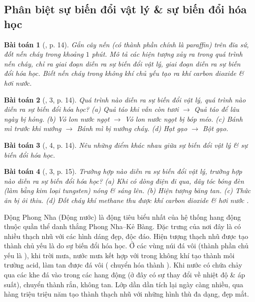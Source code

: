 \documentclass{article}
\newtheorem{baitoan}{Bài toán}
\begin{document}
\subsection{Phân biệt sự biến đổi vật lý \& sự biến đổi hóa học}

\begin{baitoan}[\cite{SGK_KHTN_8_Canh_Dieu}, p. 14]
	Gắn cây nến (có thành phần chính là paraffin) trên đĩa sứ, đốt nến cháy trong khoảng $1$ phút. Mô tả các hiện tượng xảy ra trong quá trình nến cháy, chỉ ra giai đoạn diễn ra sự biến đổi vật lý, giai đoạn diễn ra sự biến đổi hóa học. Biết nến cháy trong không khí chủ yếu tạo ra khí carbon dioxide \& hơi nước.
\end{baitoan}

\begin{baitoan}[\cite{SGK_KHTN_8_Canh_Dieu}, 3, p. 14]
	Quá trình nào diễn ra sự biến đổi vật lý, quá trình nào diễn ra sự biến đổi hóa học? (a) Quả táo khi vẫn còn tươi $\to$ Quả táo để lâu ngày bị hỏng. (b) Vỏ lon nước ngọt $\to$ Vỏ lon nước ngọt bị bóp méo. (c) Bánh mì trước khi nướng $\to$ Bánh mì bị nướng cháy. (d) Hạt gạo $\to$ Bột gạo.
\end{baitoan}

\begin{baitoan}[\cite{SGK_KHTN_8_Canh_Dieu}, 4, p. 14]
	Nêu những điểm khác nhau giữa sự biến đổi vật lý \& sự biến đổi hóa học.
\end{baitoan}

\begin{baitoan}[\cite{SGK_KHTN_8_Canh_Dieu}, 3, p. 15]
	Trường hợp nào diễn ra sự biến đổi vật lý, trường hợp nào diễn ra sự biến đổi hóa học? (a) Khi có dòng điện đi qua, dây tóc bóng đèn (làm bằng kim loại tungsten) nóng \& sáng lên. (b) Hiện tượng băng tan. (c) Thức ăn bị ôi thiu. (d) Đốt cháy khí methane \emph{} thu được khí carbon dioxide \emph{} \& hơi nước \emph{}.
\end{baitoan}
Động Phong Nha (Động nước) là động tiêu biểu nhất của hệ thống hang động thuộc quần thể danh thắng Phong Nha--Kẻ Bàng. Đặc trưng của nơi đây là có nhiều thạch nhũ với các hình dáng đẹp, độc đáo. Hiện tượng thạch nhũ được tạo thành chủ yếu là do sự biến đổi hóa học. Ở các vùng núi đá vôi (thành phần chủ yếu là ), khi trời mưa, nước mưa kết hợp với  trong không khí tạo thành môi trường acid, làm tan được đá vôi ( chuyển hóa thành ). Khi nước có chứa  chảy qua các khe đá vào trong các hang động (ở đây có sự thay đổi về nhiệt độ \& áp suất),  chuyển thành  rắn, không tan. Lớp  dần dần tích lại ngày càng nhiều, qua hàng triệu triệu năm tạo thành thạch nhũ với những hình thù đa dạng, đẹp mắt.
\end{document}
